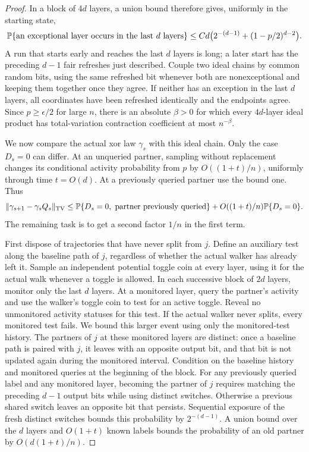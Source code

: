 \begin{proof}
In a block of $4d$ layers, a union bound therefore gives, uniformly in
the starting state,
\[
 \mathbb P\{\hbox{an exceptional layer occurs in the last }d
                   \hbox{ layers}\}
 \le C d\bigl(2^{-(d-1)}+(1-p/2)^{d-2}\bigr).
\]
A run that starts early and reaches the last $d$ layers is long;
a later start has the preceding $d-1$ fair refreshes just described.
Couple two ideal chains by common random bits, using the same refreshed
bit whenever both are nonexceptional and keeping them together once
they agree.  If neither has an exception in the last $d$ layers, all
coordinates have been refreshed identically and the endpoints agree.
Since $p\ge\epsilon/2$ for large $n$, there is an absolute $\beta>0$
for which every $4d$-layer ideal product has total-variation contraction
coefficient at most $n^{-\beta}$.

We now compare the actual xor law $\gamma_s$ with this ideal chain.
Only the case $D_s=0$ can differ.  At an unqueried partner, sampling
without replacement changes its conditional activity probability from
$p$ by $O((1+t)/n)$, uniformly through time $t=O(d)$.  At a previously
queried partner use the bound one.  Thus
\begin{equation}
 \|\gamma_{s+1}-\gamma_sQ_s\|_{\rm TV}
 \le\mathbb P\{D_s=0,\ \hbox{partner previously queried}\}
       +O((1+t)/n)\mathbb P\{D_s=0\}.
 \label{eq:c-baseline-one-step-error}
\end{equation}
The remaining task is to get a second factor $1/n$ in the first term.

First dispose of trajectories that have never split from $j$. Define
an auxiliary test along the baseline path of $j$, regardless of whether
the actual walker has already left it. Sample an independent potential
toggle coin at every layer, using it for the actual walk whenever a
toggle is allowed. In each successive block of
$2d$ layers, monitor only the last $d$ layers. At a monitored layer,
query the partner's activity and use the walker's toggle coin to test
for an active toggle. Reveal no unmonitored activity statuses for this
test. If the actual walker never splits, every monitored test fails.
We bound this larger event using only the monitored-test history.
The partners of $j$ at these monitored layers are distinct: once a
baseline path is paired with $j$, it leaves with an opposite output
bit, and that bit is not updated again during the monitored interval.
Condition on the baseline history and monitored queries at the
beginning of the block. For any
previously queried label and any monitored layer, becoming the partner
of $j$ requires matching the preceding $d-1$ output bits while using
distinct switches.  Otherwise a previous shared switch leaves an
opposite bit that persists.  Sequential exposure of the fresh distinct
switches bounds this probability by $2^{-(d-1)}$.
A union bound over the $d$ layers and $O(1+t)$ known labels bounds the
probability of an old partner by $O(d(1+t)/n)$.


\end{proof}
